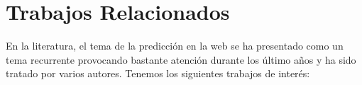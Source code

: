 

\section{Trabajos Relacionados}

En la literatura, el tema de la predicción en la web se ha presentado como un tema recurrente provocando bastante atención durante los último años y ha sido tratado por 
varios autores. Tenemos los siguientes trabajos de interés:






